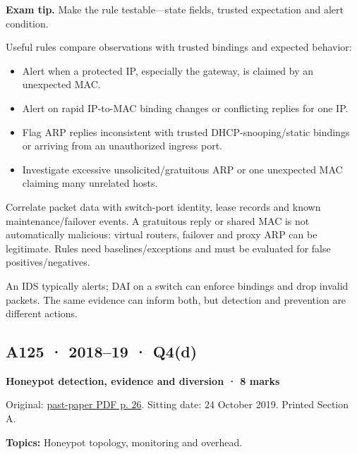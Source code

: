 \documentclass[11pt,a4paper]{article}
\begin{document}
{\color{ForestGreen}\textbf{Exam tip.} Make the rule testable—state fields,\allowbreak{} trusted expectation and alert condition.}


Useful rules compare observations with trusted bindings and expected behavior:



\begin{itemize}

\item Alert when a protected IP,\allowbreak{} especially the gateway,\allowbreak{} is claimed by an unexpected MAC.

\item Alert on rapid IP-to-MAC binding changes or conflicting replies for one IP.

\item Flag ARP replies inconsistent with trusted DHCP-snooping/\allowbreak{}static bindings or arriving from an unauthorized ingress port.

\item Investigate excessive unsolicited/\allowbreak{}gratuitous ARP or one unexpected MAC claiming many unrelated hosts.

\end{itemize}

Correlate packet data with switch-port identity,\allowbreak{} lease records and known maintenance/\allowbreak{}failover events. A gratuitous reply or shared MAC is not automatically malicious: virtual routers,\allowbreak{} failover and proxy ARP can be legitimate. Rules need baselines/\allowbreak{}exceptions and must be evaluated for false positives/\allowbreak{}negatives.


An IDS typically alerts; DAI on a switch can enforce bindings and drop invalid packets. The same evidence can inform both,\allowbreak{} but detection and prevention are different actions.




\clearpage
\subsection{A125 · 2018–19 · Q4(d)}\label{a125}

\textbf{Honeypot detection,\allowbreak{} evidence and diversion · 8 marks}


Original: \href{../../CSE405-Security_Merged.pdf\#page=26}{past-paper PDF p. 26}. Sitting date: 24 October 2019. Printed Section A.


\textbf{Topics:} Honeypot topology,\allowbreak{} monitoring and overhead.
\end{document}
